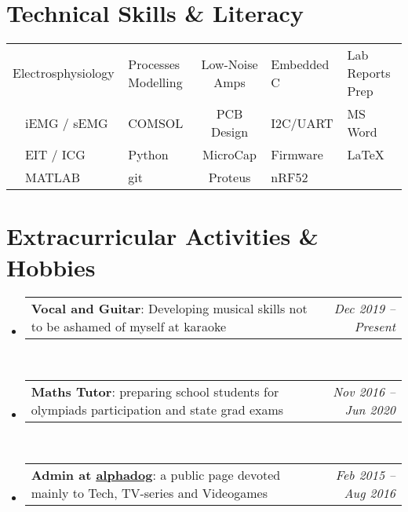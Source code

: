 \documentclass[a4paper,11pt]{article}
\makeatletter
\newcommand{\resumeProjectHeading}[2]{
    \item
    \begin{tabular*}{0.97\textwidth}{l@{\extracolsep{\fill}}r}
      \small#1 & #2 \\
    \end{tabular*}\vspace{-7pt}
}
\newcommand{\resumeSubHeadingListStart}{\begin{itemize}[leftmargin=0.15in, label={}]}
\newcommand{\resumeSubHeadingListEnd}{\end{itemize}}
\makeatother
\begin{document}
\section{Technical Skills \& Literacy}
%
%
\begin{tabularx}{1.0\textwidth} { 
   X L c R R}
$\> \> \>$    Electrosphysiology 		& Processes Modelling	& Low-Noise Amps 		& Embedded C\	& Lab Reports Prep		\\
$\> \> \>$	iEMG / sEMG 			& COMSOL			& PCB Design	 	& I2C/UART		& MS Word		 	\\
$\> \> \>$	EIT / ICG                		& Python 			& MicroCap        		& Firmware 		& \LaTeX			\\
$\> \> \>$	MATLAB			& git 				& Proteus            		& nRF52		&  			\\

\end{tabularx}

\section{Extracurricular Activities \& Hobbies}
\resumeSubHeadingListStart      
      \resumeProjectHeading
	{\textbf{Vocal and Guitar}{: Developing musical skills not to be ashamed of myself at karaoke}}{\emph{Dec 2019 -- Present}} \\
      \resumeProjectHeading
	{\textbf{Maths Tutor}{: preparing school students for olympiads participation and state grad exams}}{\emph{Nov 2016 -- Jun 2020}} \\
      \resumeProjectHeading
	{\textbf{Admin at \href{https://vk.com/alpha_dogs}{\underline{alphadog}}}{: a public page devoted mainly to Tech, TV-series and Videogames}}{\emph{Feb 2015 -- Aug 2016}} \\
\resumeSubHeadingListEnd
\end{document}
